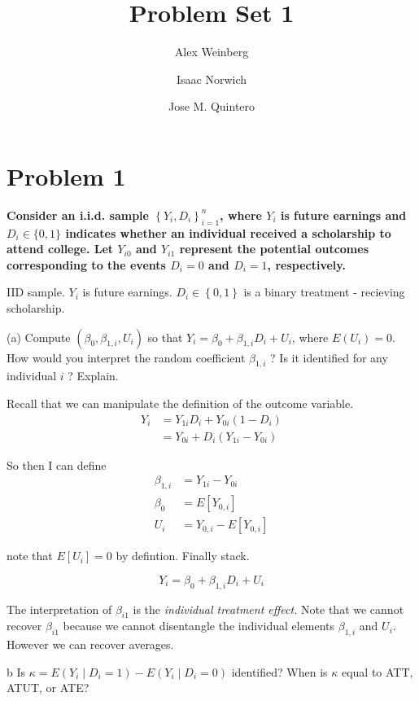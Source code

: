 \documentclass{article}
\title{Problem Set 1}
\author{Alex Weinberg \and Isaac Norwich \and Jose M. Quintero}
\begin{document}
\maketitle
\section*{Problem 1}
\textbf{Consider an i.i.d. sample $\left\{Y_{i}, D_{i}\right\}_{i=1}^{n}$, where $Y_{i}$ is future earnings and $D_{i} \in\{0,1\}$ indicates whether an individual received a scholarship to attend college. Let $Y_{i 0}$ and $Y_{i 1}$ represent the potential outcomes corresponding to the events $D_{i}=0$ and $D_{i}=1$, respectively.}

IID sample. $Y_{i}$ is future earnings. $D_{i}\in\left\{ 0,1\right\} $
is a binary treatment - recieving scholarship. 

\begin{problem}{1}
(a) Compute $\left(\beta_{0}, \beta_{1, i}, U_{i}\right)$ so that $Y_{i}=\beta_{0}+\beta_{1, i} D_{i}+U_{i}$, where $E\left(U_{i}\right)=0$. How would you interpret the random coefficient $\beta_{1, i}$ ? Is it identified for any individual $i$ ? Explain. 
\end{problem}

Recall that we can manipulate the definition of the outcome variable.
\begin{align*}
Y_{i} & =Y_{1i}D_{i}+Y_{0i}\left(1-D_{i}\right)\\
 & =Y_{0i}+D_{i}\left(Y_{1i}-Y_{0i}\right)
\end{align*}

So then I can define
\begin{align*}
\beta_{1,i} & =Y_{1i}-Y_{0i}\\
\beta_{0} & =E\left[Y_{0,i}\right]\\
U_{i} & =Y_{0,i}-E\left[Y_{0,i}\right]
\end{align*}

note that $E\left[U_{i}\right]=0$ by defintion. Finally stack.

\[
\ensuremath{Y_{i}=\beta_{0}+\beta_{1,i}D_{i}+U_{i}}
\]

The interpretation of $\beta_{i1}$ is the \emph{individual treatment
effect. }Note that we cannot recover $\beta_{i1}$ because we cannot
disentangle the individual elements $\beta_{1,i}$ and $U_{i}$. However
we can recover averages. 

\begin{problem}{b}
Is $\kappa=E\left(Y_{i} \mid D_{i}=1\right)-E\left(Y_{i} \mid D_{i}=0\right)$ identified? When is $\kappa$ equal to ATT, ATUT, or ATE? \end{problem}
\end{document}
